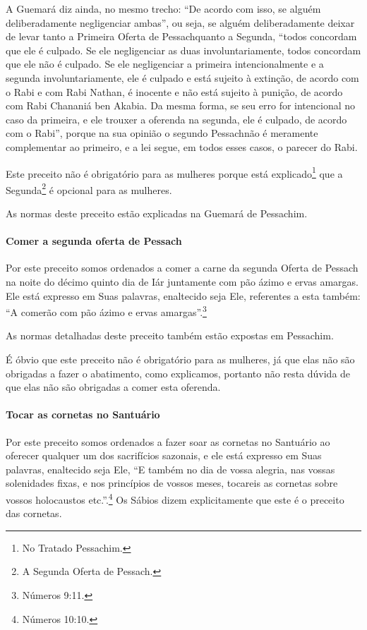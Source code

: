 \begin{multicols}{2}
A Guemará\starr{} diz ainda, no mesmo trecho: ``De acordo com isso, se alguém
deliberadamente negligenciar ambas'', ou seja, se alguém deliberadamente
deixar de levar tanto a Primeira Oferta de Pessach\starr quanto a Segunda,
``todos concordam que ele é culpado. Se ele negligenciar as duas
involuntariamente, todos concordam que ele não é culpado. Se ele
negligenciar a primeira intencionalmente e a segunda involuntariamente,
ele é culpado e está sujeito à extinção, de acordo com o Rabi e com Rabi
Nathan\starr, é inocente e não está sujeito à punição, de acordo com Rabi
Chananiá ben Akabia\starr. Da mesma forma, se seu erro for intencional no caso
da primeira, e ele trouxer a oferenda na segunda, ele é culpado, de
acordo com o Rabi'', porque na sua opinião o segundo Pessach\starr não é
meramente complementar ao primeiro, e a lei segue, em todos esses casos,
o parecer do Rabi.

Este preceito não é obrigatório para as mulheres porque está explicado\footnote{No Tratado Pessachim\starr.} que a Segunda\footnote{A Segunda Oferta de Pessach\starr.} é opcional para as mulheres.

As normas deste preceito estão explicadas na Guemará\starr{} de Pessachim\starr.

\paragraph{Comer a segunda oferta de Pessach\starr{}}

Por este preceito somos ordenados a comer a carne da segunda Oferta de
Pessach\starr{} na noite do décimo quinto dia de Iár juntamente com pão
ázimo e ervas amargas. Ele está expresso em Suas palavras, enaltecido
seja Ele, referentes a esta também: ``A comerão com pão ázimo e ervas
amargas''.\footnote{Números 9:11.}

As normas detalhadas deste preceito também estão expostas em Pessachim\starr.

É óbvio que este preceito não é obrigatório para as mulheres, já que
elas não são obrigadas a fazer o abatimento, como explicamos, portanto
não resta dúvida de que elas não são obrigadas a comer esta oferenda.

\paragraph{Tocar as cornetas no Santuário}

Por este preceito somos ordenados a fazer soar as cornetas no Santuário
ao oferecer qualquer um dos sacrifícios sazonais, e ele está expresso em
Suas palavras, enaltecido seja Ele, ``E também no dia de vossa alegria,
nas vossas solenidades fixas, e nos princípios de vossos meses,
tocareis as cornetas sobre vossos holocaustos etc.''.\footnote{Números 10:10.}
Os Sábios dizem explicitamente que este é o preceito das cornetas.


\end{multicols}
